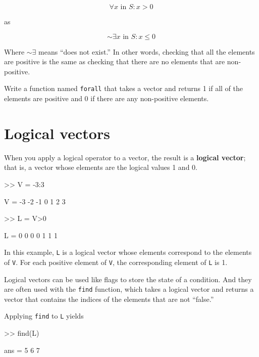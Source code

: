 \documentclass[
]{book}
\numberwithin{Answer}{chapter}
\numberwithin{Exercise}{chapter}
\begin{document}
\begin{equation}
\forall x \mbox{~in~} S: x>0
\end{equation}

as

\begin{equation}
\sim \exists x \mbox{~in~} S: x \le 0
\end{equation}

Where $\sim \exists$ means ``does not exist.''
In other words, checking that all the elements are positive is
the same as checking that there are no elements
that are non-positive.

\begin{ex}
Write a function named {\tt forall} that
takes a vector and returns 1 if all of the elements are positive
and 0 if there are any non-positive elements.
\end{ex}




\section{Logical vectors}

When you apply a logical operator to a vector, the result is a 
{\bf logical vector}; that is, a vector whose elements are the logical
values 1 and 0.


\begin{code}
>> V = -3:3

V = -3    -2    -1     0     1     2     3

>> L = V>0

L =  0     0     0     0     1     1     1
\end{code}

In this example, {\tt L} is a logical vector whose elements
correspond to the elements of {\tt V}.  For each positive element of
{\tt V}, the corresponding element of {\tt L} is 1.

Logical vectors can be used like flags to store the state of
a condition.  And they are often used with the {\tt find} function,
which takes a logical vector and returns a vector that contains
the indices of the elements that are not ``false.''


Applying {\tt find} to {\tt L} yields

\begin{code}
>> find(L)

ans = 5     6     7
\end{code}
\end{document}
